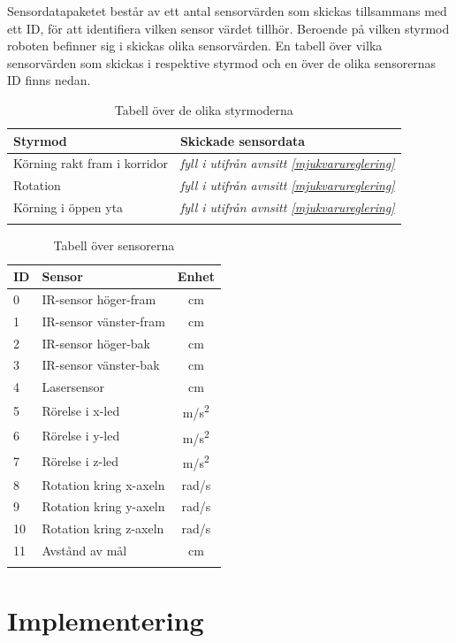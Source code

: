 \documentclass[11pt]{article}
\begin{document}
\begin{flushleft}
Sensordatapaketet består av ett antal sensorvärden som skickas tillsammans med ett ID, för att identifiera vilken sensor värdet tillhör. Beroende på vilken styrmod roboten befinner sig i skickas olika sensorvärden. En tabell över vilka sensorvärden som skickas i respektive styrmod och en över de olika sensorernas ID finns nedan.

\begin{longtable}[l]{| l | l |} \hline
\textbf{Styrmod} & \textbf{Skickade sensordata} \\ \hline 
Körning rakt fram i korridor & \textit{fyll i utifrån avnsitt \ref{mjukvarureglering}} \\ \hline
Rotation & \textit{fyll i utifrån avnsitt \ref{mjukvarureglering}} \\ \hline
Körning i öppen yta & \textit{fyll i utifrån avnsitt \ref{mjukvarureglering}} \\ \hline
\caption{Tabell över de olika styrmoderna}
\end{longtable}

\begin{longtable}[l]{| l | l | c |} \hline
\textbf{ID} & \textbf{Sensor} & \textbf{Enhet} \\ \hline 
0 & IR-sensor höger-fram & cm \\ \hline
1 & IR-sensor vänster-fram  & cm \\ \hline
2 & IR-sensor höger-bak  & cm  \\ \hline
3 & IR-sensor vänster-bak  &  cm \\ \hline
4 & Lasersensor & cm  \\ \hline
5 & Rörelse i x-led & m/s\textsuperscript{2} \\ \hline
6 & Rörelse i y-led & m/s\textsuperscript{2} \\ \hline
7 & Rörelse i z-led & m/s\textsuperscript{2} \\ \hline
8 & Rotation kring x-axeln & rad/s \\ \hline
9 & Rotation kring y-axeln & rad/s \\ \hline
10 & Rotation kring z-axeln & rad/s \\ \hline
11 & Avstånd av mål & cm \\ \hline
\caption{Tabell över sensorerna}
\end{longtable}


\pagebreak
\section{Implementering}


\end{flushleft}
\end{document}
